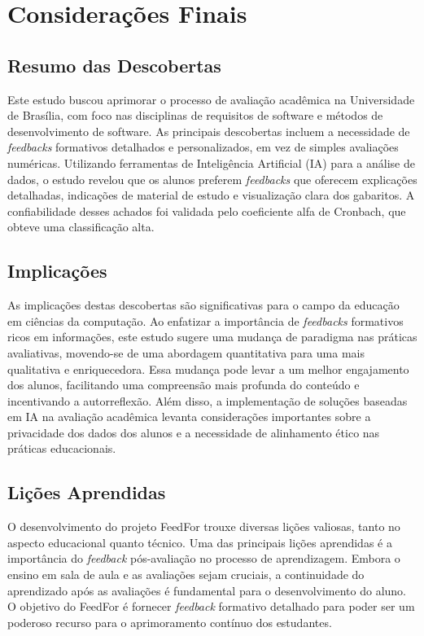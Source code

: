 \chapter{Considerações Finais}

\section{Resumo das Descobertas}

Este estudo buscou aprimorar o processo de avaliação acadêmica na Universidade de Brasília, com foco nas disciplinas de requisitos de software e métodos de desenvolvimento de software. As principais descobertas incluem a necessidade de \textit{feedbacks} formativos detalhados e personalizados, em vez de simples avaliações numéricas. Utilizando ferramentas de Inteligência Artificial (IA) para a análise de dados, o estudo revelou que os alunos preferem \textit{feedbacks} que oferecem explicações detalhadas, indicações de material de estudo e visualização clara dos gabaritos. A confiabilidade desses achados foi validada pelo coeficiente alfa de Cronbach, que obteve uma classificação alta.

\section{Implicações}

As implicações destas descobertas são significativas para o campo da educação em ciências da computação. Ao enfatizar a importância de \textit{feedbacks} formativos ricos em informações, este estudo sugere uma mudança de paradigma nas práticas avaliativas, movendo-se de uma abordagem quantitativa para uma mais qualitativa e enriquecedora. Essa mudança pode levar a um melhor engajamento dos alunos, facilitando uma compreensão mais profunda do conteúdo e incentivando a autorreflexão. Além disso, a implementação de soluções baseadas em IA na avaliação acadêmica levanta considerações importantes sobre a privacidade dos dados dos alunos e a necessidade de alinhamento ético nas práticas educacionais.

\section{Lições Aprendidas}

O desenvolvimento do projeto FeedFor trouxe diversas lições valiosas, tanto no aspecto educacional quanto técnico. Uma das principais lições aprendidas é a importância do \textit{feedback} pós-avaliação no processo de aprendizagem. Embora o ensino em sala de aula e as avaliações sejam cruciais, a continuidade do aprendizado após as avaliações é fundamental para o desenvolvimento do aluno. O objetivo do FeedFor é fornecer \textit{feedback} formativo detalhado para poder ser um poderoso recurso para o aprimoramento contínuo dos estudantes.

